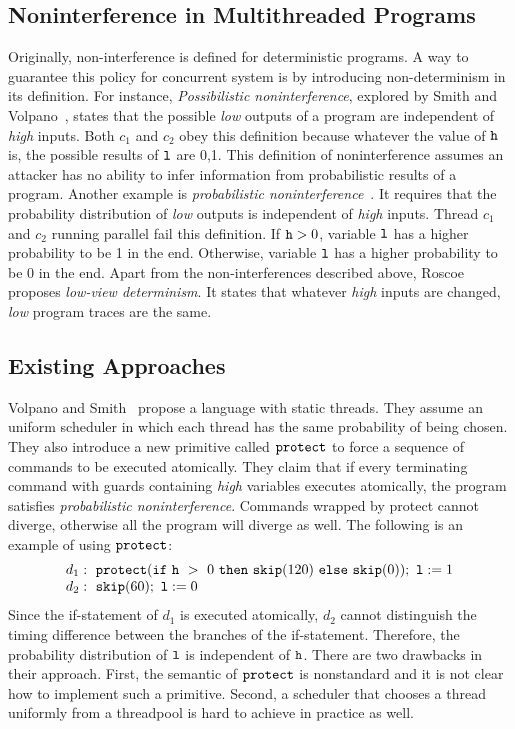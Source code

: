 \documentclass[a4paper]{report}
\newcommand{\co}[1]{$\cod{#1}$}
\begin{document}
\subsection{Noninterference in Multithreaded Programs}
\label{chap2:multithreaded:noninterference}
Originally, non-interference is defined for deterministic programs. 
A way to guarantee this policy for concurrent system is by introducing
non-determinism in its definition.
For instance, {\em Possibilistic noninterference}, explored by Smith and 
Volpano~\cite{Smith:Volpano:MultiThreaded}, states that the possible 
{\it low} outputs of a program are independent of {\it high} inputs. 
Both $c_1$ and $c_2$ obey this definition because whatever the value of 
$\mathtt{h}$ is, the possible results of $\mathtt{l}$ are 0,1. This definition of 
noninterference assumes an attacker has no ability to infer information
from probabilistic results of a program. Another example is 
{\em probabilistic noninterference}~\cite{Volpano:Smith:Probabilistic}. 
It requires that the probability distribution of {\it low} outputs
is independent of {\it high} inputs. 
Thread $c_1$ and $c_2$ running parallel fail this definition.
If $\mathtt{h}>0$, variable \co{l} has a higher probability to be 1 in the end.
Otherwise, variable \co{l} has a higher probability to be 0 in the end.
Apart from the non-interferences described 
above, Roscoe~\cite{Roscoe:SSP95} proposes
{\em low-view determinism}. It states that whatever {\it high} inputs are changed,
{\it low} program traces are the same.

\subsection{Existing Approaches}
\label{chap2:multithreaded:approach}
Volpano and Smith~\cite{Volpano:Smith:Probabilistic} propose a language
with static threads. They assume an uniform scheduler in which
each thread has the same probability of being chosen. They also
introduce a new primitive called $\mathtt{protect}$ to force a sequence of commands
to be executed atomically. They claim that if every terminating command with guards containing
{\it high} variables executes atomically, the program satisfies {\em probabilistic
noninterference}. Commands wrapped by protect cannot diverge, otherwise all the program
will diverge as well.
The following is an example of using $\mathtt{protect}$:
\begin{equation}
 \begin{array}{l}
d_1:~\cod{protect}(\ifthenelse{\cod{h}~>~0}{\cod{skip}(120)}{\cod{skip}(0)});~\cod{l}:=1 \\
d_2:~\cod{skip}(60);~\cod{l}:=0
 \end{array}
\label{chap2:example:protect}
\end{equation}
Since the if-statement of $d_1$ is executed atomically, $d_2$ cannot
distinguish the timing difference between the branches of the if-statement.
Therefore, the probability distribution of $\mathtt{l}$ is independent of $\mathtt{h}$.
There are two drawbacks in their approach.
First, the semantic of \co{protect} is nonstandard and it is
not clear how to implement such a primitive. Second, a scheduler 
that chooses a thread uniformly from a threadpool 
is hard to achieve in practice as well.
\end{document}
